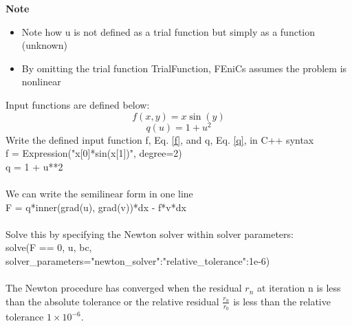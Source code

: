 \documentclass[12pt,3p]{article}
\begin{document}
\textbf{Note}
\begin{itemize}
\item Note how u is not defined as a trial function but simply as a function (unknown) 
\item By omitting the trial function {\selectfont TrialFunction}, FEniCs assumes the problem is nonlinear 
\end{itemize}
Input functions are defined below:
\begin{equation}\label{f}
f(x,y) = x \sin(y)
\end{equation}
\begin{equation}\label{q}
q(u) = 1 + u^2
\end{equation} 
Write the defined input function f, Eq. \ref{f}, and q, Eq. \ref{q}, in C++ syntax \\
{\selectfont
f = Expression("x[0]*sin(x[1])", degree=2) \\ 
q = 1 + u**2 \\ \\
}
We can write the semilinear form in one line \\
{\selectfont
F = q*inner(grad(u), grad(v))*dx - f*v*dx \\ \\ 
}
Solve this by specifying the Newton solver within solver parameters: \\
{\selectfont
solve(F == 0, u, bc, \\
\indent \indent	solver\_parameters={"newton\_solver":{"relative\_tolerance":1e-6}}) \\ \\
}
The Newton procedure has converged when the residual $r_n$ at iteration n is less than the absolute tolerance or the relative residual $\frac{r_n}{r_0}$ is less than the relative tolerance $1 \times 10^{-6}$. \\ \\
\end{document}

